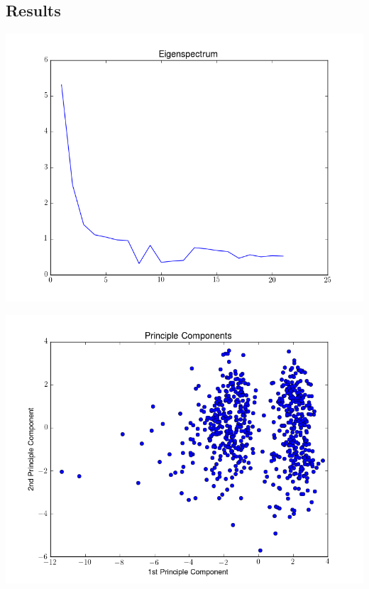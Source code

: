 \subsection{Results}
\begin{minipage}{7cm}
  \centering
  \includegraphics[scale=0.38]{img/eigenspectrum.png}
  \label{eigenspectrum}
\end{minipage}
\begin{minipage}{7cm}
  \centering
  \includegraphics[scale=0.38]{img/components.png}
  \label{components}
\end{minipage}
